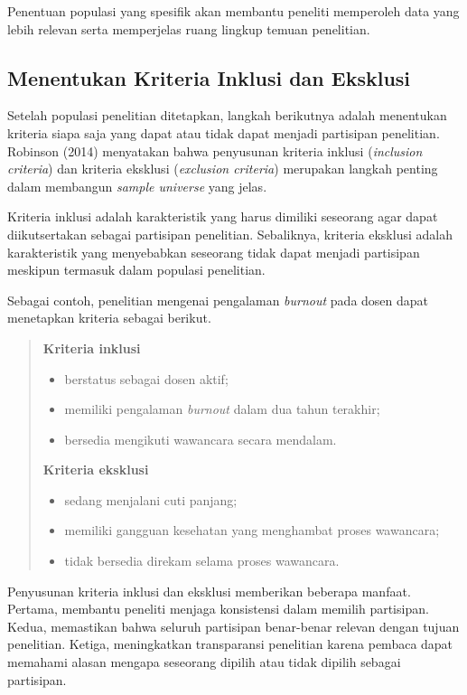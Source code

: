 \documentclass[
  indonesian,
  letterpaper,
  DIV=11,
  numbers=noendperiod]{scrreprt}
\providecommand{\tightlist}{%
  \setlength{\itemsep}{0pt}\setlength{\parskip}{0pt}}
\begin{document}
Penentuan populasi yang spesifik akan membantu peneliti memperoleh data
yang lebih relevan serta memperjelas ruang lingkup temuan penelitian.

\subsection{Menentukan Kriteria Inklusi dan
Eksklusi}\label{menentukan-kriteria-inklusi-dan-eksklusi}

Setelah populasi penelitian ditetapkan, langkah berikutnya adalah
menentukan kriteria siapa saja yang dapat atau tidak dapat menjadi
partisipan penelitian. Robinson (2014) menyatakan bahwa penyusunan
kriteria inklusi (\emph{inclusion criteria}) dan kriteria eksklusi
(\emph{exclusion criteria}) merupakan langkah penting dalam membangun
\emph{sample universe} yang jelas.

Kriteria inklusi adalah karakteristik yang harus dimiliki seseorang agar
dapat diikutsertakan sebagai partisipan penelitian. Sebaliknya, kriteria
eksklusi adalah karakteristik yang menyebabkan seseorang tidak dapat
menjadi partisipan meskipun termasuk dalam populasi penelitian.

Sebagai contoh, penelitian mengenai pengalaman \emph{burnout} pada dosen
dapat menetapkan kriteria sebagai berikut.

\begin{quote}
\textbf{Kriteria inklusi}

\begin{itemize}
\tightlist
\item
  berstatus sebagai dosen aktif;
\item
  memiliki pengalaman \emph{burnout} dalam dua tahun terakhir;
\item
  bersedia mengikuti wawancara secara mendalam.
\end{itemize}

\textbf{Kriteria eksklusi}

\begin{itemize}
\tightlist
\item
  sedang menjalani cuti panjang;
\item
  memiliki gangguan kesehatan yang menghambat proses wawancara;
\item
  tidak bersedia direkam selama proses wawancara.
\end{itemize}
\end{quote}

Penyusunan kriteria inklusi dan eksklusi memberikan beberapa manfaat.
Pertama, membantu peneliti menjaga konsistensi dalam memilih partisipan.
Kedua, memastikan bahwa seluruh partisipan benar-benar relevan dengan
tujuan penelitian. Ketiga, meningkatkan transparansi penelitian karena
pembaca dapat memahami alasan mengapa seseorang dipilih atau tidak
dipilih sebagai partisipan.
\end{document}
